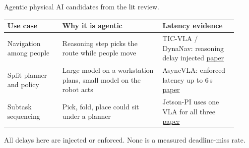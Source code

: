 \documentclass[11pt,aspectratio=43]{beamer}
\begin{document}
\begin{frame}{Agentic physical AI candidates from the lit review.}

\begin{center}
\footnotesize
\raggedright
\renewcommand{\arraystretch}{1.2}
\setlength{\aboverulesep}{0pt}
\setlength{\belowrulesep}{0pt}
\begin{tabular}{>{\raggedright\arraybackslash}p{0.22\linewidth}|>{\raggedright\arraybackslash}p{0.40\linewidth}|>{\raggedright\arraybackslash}p{0.30\linewidth}}
\toprule
\textbf{Use case} & \textbf{Why it is agentic} & \textbf{Latency evidence} \\
\midrule
Navigation among people & Reasoning step picks the route while people move & TIC-VLA / DynaNav: reasoning delay injected \href{https://arxiv.org/abs/2602.02459}{\underline{paper}} \\
Split planner and policy & Large model on a workstation plans, small model on the robot acts & AsyncVLA: enforced latency up to 6\,s \href{https://arxiv.org/abs/2602.13476}{\underline{paper}} \\
Subtask sequencing & Pick, fold, place could sit under a planner & Jetson-PI uses one VLA for all three \href{https://arxiv.org/abs/2607.12659}{\underline{paper}} \\
\bottomrule
\end{tabular}
\end{center}

\vspace{0.3em}
\small
All delays here are injected or enforced. None is a measured deadline-miss rate.

\end{frame}
\end{document}
